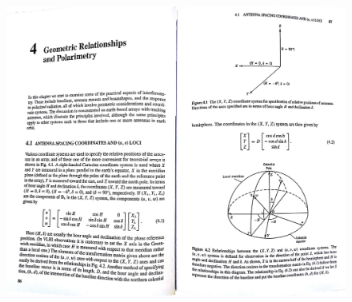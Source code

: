 \documentclass[11pt, a4paper]{article}  %
\begin{document}
\begin{CJK}{UTF8}{gbsn}
\begin{figure}
\center
\includegraphics[width=16cm]{uvw_coordinate.eps}
\end{figure}



\end{CJK}
\end{document}
